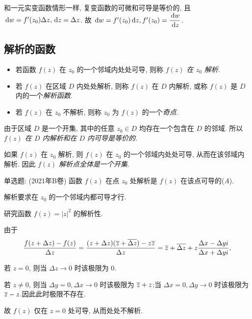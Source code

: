 \documentclass[nocolor,theme=doremi,lang=cn,11pt,chinese,twoside,openright,usesamecnt]{elegantbook}
\newcommand\fillbrace[1]{{(\nolinebreak\hspace{0.5em minus 0.5em}\emph{#1}\hspace{0.5em minus 0.5em}\nolinebreak)}}
\begin{document}
和一元实变函数情形一样, 复变函数的可微和可导是等价的, 且 $\,\mathrm{d} w=f'(z_0)\Delta z, \,\mathrm{d} z=\Delta z$.
故 \emph{$\,\mathrm{d} w=f'(z_0)\,\mathrm{d} z,f'(z_0)=\dfrac{\,\mathrm{d} w}{\,\mathrm{d} z}$}.

\subsection{解析的函数}

\begin{definition}
	\begin{itemize}
		\item 若函数 $f(z)$ 在 $z_0$ 的一个邻域内处处可导, 则称 \emph{$f(z)$ 在 $z_0$ 解析}.
		\item 若 $f(z)$ 在区域 $D$ 内处处解析, 则称 $f(z)$ 在 $D$ 内解析, 或称 $f(z)$ 是 $D$ 内的一个\emph{解析函数}.
		\item 若 $f(z)$ 在 $z_0$ 不解析, 则称 $z_0$ 为 $f(z)$ 的一个\emph{奇点}.
	\end{itemize}
\end{definition}

由于区域 $D$ 是一个开集, 其中的任意 $z_0\in D$ 均存在一个包含在 $D$ 的邻域. 
所以 \emph{$f(z)$ 在 $D$ 内解析和在 $D$ 内可导是等价的}.

如果 $f(z)$ 在 $z_0$ 解析, 则 $f(z)$ 在 $z_0$ 的一个邻域内处处可导, 从而在该邻域内解析.
因此 \emph{$f(z)$ 解析点全体是一个开集}.

\begin{exercise}
	单选题: (2021年B卷) 函数 $f(z)$ 在点 $z_0$ 处解析是 $f(z)$ 在该点可导的\fillbrace{{A}}.
\end{exercise}

\begin{answer}
	解析要求在 $z_0$ 的一个邻域内都可导才行.
\end{answer}

\begin{example}
	研究函数 $f(z)=|z|^2$ 的解析性.
\end{example}

\begin{solution}
	由于
	\[
		\frac{f(z+\Delta z)-f(z)}{\Delta z}
		=\frac{(z+\Delta z)(\overline z+\overline{\Delta z})-z\overline z}{\Delta z}
		=\overline z+\overline{\Delta z}+z\frac{\Delta x-\Delta yi}{\Delta x+\Delta yi},
	\]

	{若 $z=0$, 则当 $\Delta z\to 0$ 时该极限为 $0$.}

	{若 $z\neq0$, 则当 $\Delta y=0,\Delta x\to 0$ 时该极限为 $\overline z+z$;当 $\Delta x=0,\Delta y\to 0$ 时该极限为 $\overline z-z$.因此此时极限不存在.}

	{故 $f(z)$ 仅在 $z=0$ 处可导, 从而处处不解析.}
\end{solution}
\end{document}
